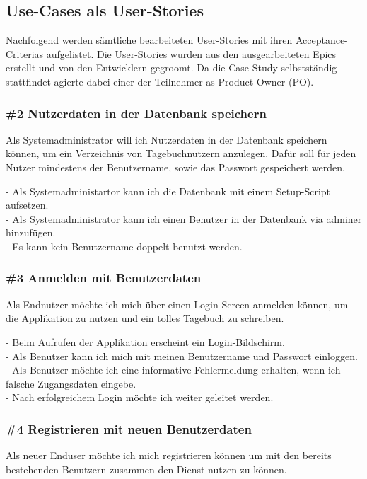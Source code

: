 \subsection{Use-Cases als User-Stories}
Nachfolgend werden sämtliche bearbeiteten User-Stories mit ihren Acceptance-Criterias aufgelistet. Die User-Stories wurden aus den ausgearbeiteten Epics erstellt und von den Entwicklern gegroomt. Da die Case-Study selbstständig stattfindet agierte dabei einer der Teilnehmer as Product-Owner (PO).


\subsubsection*{\#2 Nutzerdaten in der Datenbank speichern}
Als Systemadministrator will ich Nutzerdaten in der Datenbank speichern können, um ein Verzeichnis von Tagebuchnutzern anzulegen. Dafür soll für jeden Nutzer mindestens der Benutzername, sowie das Passwort gespeichert werden.
  
\noindent
- Als Systemadministartor kann ich die Datenbank mit einem Setup-Script aufsetzen.\\
- Als Systemadministrator kann ich einen Benutzer in der Datenbank via adminer hinzufügen.\\
- Es kann kein Benutzername doppelt benutzt werden.


\subsubsection*{\#3 Anmelden mit Benutzerdaten}
Als Endnutzer möchte ich mich über einen Login-Screen anmelden können, um die Applikation zu nutzen und ein tolles Tagebuch zu schreiben.

\noindent
- Beim Aufrufen der Applikation erscheint ein Login-Bildschirm.\\
- Als Benutzer kann ich mich mit meinen Benutzername und Passwort einloggen.\\
- Als Benutzer möchte ich eine informative Fehlermeldung erhalten, wenn ich falsche Zugangsdaten eingebe.\\
- Nach erfolgreichem Login möchte ich weiter geleitet werden.


\subsubsection*{\#4 Registrieren mit neuen Benutzerdaten}
Als neuer Enduser möchte ich mich registrieren können um mit den bereits bestehenden Benutzern zusammen den Dienst nutzen zu können.

